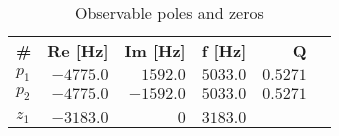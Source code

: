 \begin{table}[H]
\centering
\begin{tabular}[c]{lrrrrr}
\textbf{\#} & \textbf{Re [Hz]} & \textbf{Im [Hz]} & \textbf{f [Hz]} & \textbf{Q} \\ 
\rowcolor{myyellow}
$p_{1}$ &$-4775.0$ &$1592.0$ &$5033.0$ &$0.5271$ \\ 
$p_{2}$ &$-4775.0$ &$-1592.0$ &$5033.0$ &$0.5271$ \\ 
\rowcolor{myyellow}
\small{ } \\ 
$z_{1}$ &$-3183.0$ &$0$ &$3183.0$ \\ 
\end{tabular}
\caption{Observable poles and  zeros}
\end{table}

